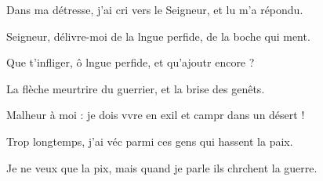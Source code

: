 \item Dans ma détresse, j’ai cri vers le Seigneur,\psstar{} et lu m’a répondu.
\item Seigneur, délivre-moi de la lngue perfide,\psstar{} de la boche qui ment.
\item Que t’infliger, ô lngue perfide,\psstar{} et qu’ajoutr encore ?
\item La flèche meurtrire du guerrier,\psstar{} et la brise des genêts.
\item Malheur à moi : je dois vvre en exil\psstar{} et campr dans un désert !
\item Trop longtemps, j’ai véc parmi ces gens\psstar{} qui hassent la paix.
\item Je ne veux que la pix, mais quand je parle\psstar{} ils chrchent la guerre.